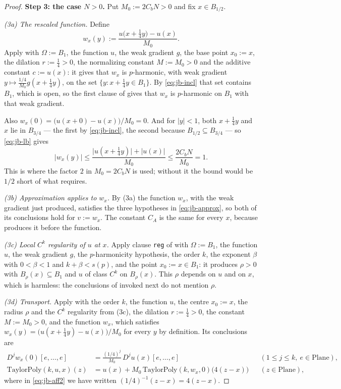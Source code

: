 \begin{proof}
\medskip\noindent\textbf{Step 3: the case $N>0$.}
Put $M_0:=2C_bN>0$ and fix $x\in B_{1/2}$.

\emph{(3a) The rescaled function.}  Define
\[
  w_x(y):=\frac{u\bigl(x+\tfrac14y\bigr)-u(x)}{M_0}.
\]
Apply  with $\Omega:=B_1$, the function $u$, the weak gradient $g$, the
base point $x_0:=x$, the dilation $r:=\tfrac14>0$, the normalizing constant $M:=M_0>0$ and the
additive constant $c:=u(x)$: it gives that $w_x$ is $p$-harmonic, with weak gradient
$y\mapsto\tfrac{1/4}{M_0}g(x+\tfrac14y)$, on the set $\{y:x+\tfrac14y\in B_1\}$.  By
\eqref{eq:jb-incl} that set contains $B_1$, which is open, so the first clause of
 gives that $w_x$ is $p$-harmonic on $B_1$ with that weak gradient.

Also $w_x(0)=\bigl(u(x+0)-u(x)\bigr)/M_0=0$.  And for $\lvert y\rvert<1$, both
$x+\tfrac14y$ and $x$ lie in $B_{3/4}$ --- the first by \eqref{eq:jb-incl}, the second because
$B_{1/2}\subseteq B_{3/4}$ --- so \eqref{eq:jb-lb} gives
\[
  \lvert w_x(y)\rvert\le\frac{\lvert u(x+\tfrac14y)\rvert+\lvert u(x)\rvert}{M_0}
  \le\frac{2C_bN}{M_0}=1 .
\]
This is where the factor $2$ in $M_0=2C_bN$ is used; without it the bound would be $1/2$ short
of what  requires.

\emph{(3b) Approximation applies to $w_x$.}  By (3a) the function $w_x$, with the weak gradient
just produced, satisfies the three hypotheses in \eqref{eq:jb-approx}, so both of its
conclusions hold for $v:=w_x$.  The constant $C_A$ is the same for every $x$, because
 produces it before the function.

\emph{(3c) Local $C^{k}$ regularity of $u$ at $x$.}  Apply clause \texttt{reg} of
 with $\Omega:=B_1$, the function $u$, the weak gradient $g$, the
$p$-harmonicity hypothesis, the order $k$, the exponent $\beta$ with $0<\beta<1$ and
$k+\beta<s(p)$, and the point $x_0:=x\in B_1$: it produces $\rho>0$ with $B_\rho(x)\subseteq
B_1$ and $u$ of class $C^{k}$ on $B_\rho(x)$.  This $\rho$ depends on $u$ and on $x$, which is
harmless: the conclusions of  invoked next do not mention $\rho$.

\emph{(3d) Transport.}  Apply  with the order $k$, the function $u$,
the centre $x_0:=x$, the radius $\rho$ and the $C^{k}$ regularity from (3c), the dilation
$r:=\tfrac14>0$, the constant $M:=M_0>0$, and the function $w_x$, which satisfies
$w_x(y)=\bigl(u(x+\tfrac14y)-u(x)\bigr)/M_0$ for every $y$ by definition.  Its conclusions are
\begin{align}
  D^{j}w_x(0)[e,\ldots,e]&=\frac{(1/4)^{j}}{M_0}\,D^{j}u(x)[e,\ldots,e]
    &&(1\le j\le k,\ e\in\mathrm{Plane}),\label{eq:jb-aff1}\\
  \mathrm{TaylorPoly}(k,u,x)(z)&=u(x)+M_0\,
    \mathrm{TaylorPoly}(k,w_x,0)\bigl(4(z-x)\bigr)&&(z\in\mathrm{Plane}),\label{eq:jb-aff2}
\end{align}
where in \eqref{eq:jb-aff2} we have written $(1/4)^{-1}(z-x)=4(z-x)$.


\end{proof}
